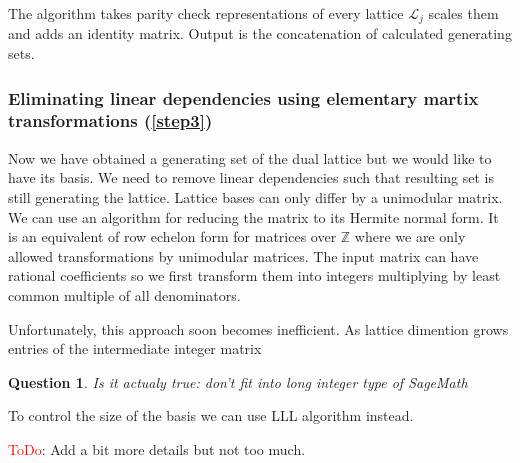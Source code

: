 \documentclass[12pt]{article}
\newcommand{\ZZ}{\mathbb{Z}}
\newcommand{\LL}{\mathcal{L}}
\DeclareMathOperator{\Span}{Span}
\newtheorem{question}{Question}
\begin{document}
The algorithm takes parity check representations of every lattice $\LL_{j}$ scales them and adds an identity matrix. Output is the concatenation of calculated generating sets.

\subsubsection{Eliminating linear dependencies using elementary martix transformations (\ref{step3})}

Now we have obtained a generating set of the dual lattice but we would like to have its basis. We need to remove linear dependencies such that resulting set is still generating the lattice. Lattice bases can only differ by a unimodular matrix. We can use an algorithm for reducing the matrix to its Hermite normal form. It is an equivalent of row echelon form for matrices over $\ZZ$ where we are only allowed transformations by unimodular matrices. The input matrix can have rational coefficients so we first transform them into integers multiplying by least common multiple of all denominators.

Unfortunately, this approach soon becomes inefficient. As lattice dimention grows entries of the intermediate integer matrix

\begin{question}
    Is it actualy true: don't fit into long integer type of SageMath
\end{question}

To control the size of the basis we can use LLL algorithm instead.


\textcolor{red}{ToDo}: Add a bit more details but not too much.





\end{document}
